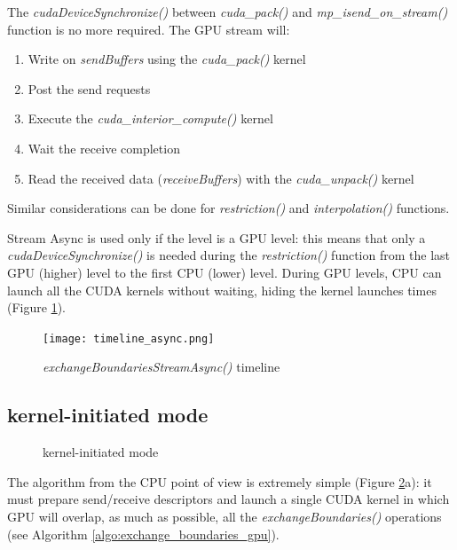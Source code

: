 \documentclass[conference]{IEEEtran}
\begin{document}
The \textit{cudaDeviceSynchronize()} between \textit{cuda\_pack()} and \textit{mp\_isend\_on\_stream()} function is no more required. The GPU stream will:

\begin{enumerate}
\item Write on \textit{sendBuffers} using the \textit{cuda\_pack()} kernel
\item Post the send requests
\item Execute the \textit{cuda\_interior\_compute()} kernel
\item Wait the receive completion
\item Read the received data (\textit{receiveBuffers}) with the \textit{cuda\_unpack()} kernel
\end{enumerate}

Similar considerations can be done for \textit{restriction()} and \textit{interpolation()} functions.

Stream Async is used only if the level is a GPU level: this means that only a \textit{cudaDeviceSynchronize()} is needed during the \textit{restriction()} function from the last GPU (higher) level to the first CPU (lower) level. During GPU levels, CPU can launch all the CUDA kernels without waiting, hiding the kernel launches times (Figure \ref{fig:timeline_async}).

\begin{figure}[h]
\centering
\texttt{[image: timeline\_async.png]}
\caption{\textit{exchangeBoundariesStreamAsync()} timeline}
\label{fig:timeline_async}
\end{figure}

\subsection{kernel-initiated mode}

\begin{figure}
\hfil
{}
\caption{kernel-initiated mode}
\label{fig:gpu_initited}
\end{figure}

The algorithm from the CPU point of view is extremely simple (Figure \ref{fig:gpu_initited}a): it must prepare send/receive descriptors and launch a single CUDA kernel in which GPU will overlap, as much as possible, all the \textit{exchangeBoundaries()} operations (see Algorithm \ref{algo:exchange_boundaries_gpu}).
\end{document}
